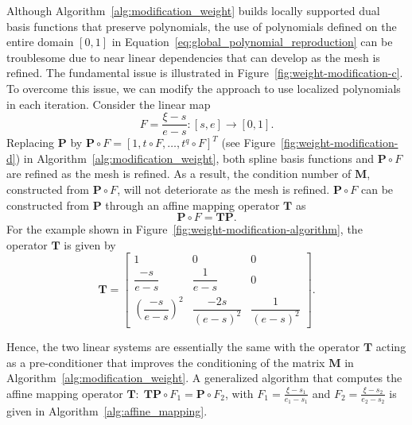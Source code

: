 Although Algorithm~\ref{alg:modification_weight} builds locally supported dual basis functions that preserve polynomials, the use of polynomials defined on the entire domain $\left[0, 1 \right]$ in Equation~\eqref{eq:global_polynomial_reproduction} can be troublesome due to near linear dependencies that can develop as the mesh is refined. The fundamental issue is illustrated in Figure~\ref{fig:weight-modification-c}. To overcome this issue, we can modify the approach to use localized polynomials in each iteration. Consider the linear map
\begin{equation}
	F=\frac{\xi-s}{e-s}\colon  \left[s, e \right]\rightarrow \left[0 , 1\right].
\end{equation}
Replacing $\mathbf{P}$ by $\mathbf{P}\circ F = \left[1, t\circ F, \dots, t^q\circ F\right]^T$ (see Figure~\ref{fig:weight-modification-d}) in Algorithm~\ref{alg:modification_weight}, both spline basis functions and $\mathbf{P}\circ F$ are refined as the mesh is refined. As a result, the condition number of $\mathbf{M}$, constructed from $\mathbf{P}\circ F$, will not deteriorate as the mesh is refined. $\mathbf{P}\circ F$ can be constructed from $\mathbf{P}$ through an affine mapping operator $\mathbf{T}$ as
\begin{equation}
	\mathbf{P}\circ F = \mathbf{T} \mathbf{P}.
\end{equation}
For the example shown in Figure~\ref{fig:weight-modification-algorithm}, the operator $\mathbf{T}$ is given by
\begin{equation}
	\mathbf{T}=
	\begin{bmatrix}
		1                              & 0                    & 0                  \\
		\dfrac{-s}{e-s}                & \dfrac{1}{e-s}       & 0                  \\
		\left(\dfrac{-s}{e-s}\right)^2 & \dfrac{-2s}{(e-s)^2} & \dfrac{1}{(e-s)^2}
	\end{bmatrix}.
\end{equation}

Hence, the two linear systems are essentially the same with the operator $\mathbf{T}$ acting as a pre-conditioner that improves the conditioning of the matrix $\mathbf{M}$ in Algorithm~\ref{alg:modification_weight}. A generalized algorithm that computes the affine mapping operator $\mathbf{T}\colon\; \mathbf{T}\mathbf{P}\circ F_1=\mathbf{P}\circ F_2$, with $F_1 = \frac{\xi-s_1}{e_1-s_1}$ and $F_2 = \frac{\xi-s_2}{e_2-s_2}$ is given in Algorithm~\ref{alg:affine_mapping}.\par


